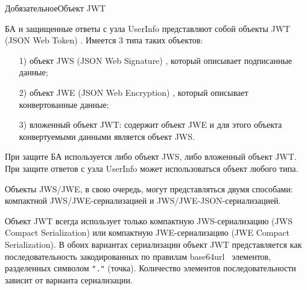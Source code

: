 \begin{appendix}{Д}{обязательное}{Объект JWT}\label{JWT}




БА и защищенные ответы с узла UserInfo представляют собой объекты 
JWT (JSON Web Token) \cite{RFC7519}. 
%
Имеется 3 типа таких объектов: 
\begin{itemize}
\item[1)] 
объект JWS (JSON Web Signature) \cite{RFC7515},
который описывает подписанные данные;
\item[2)] 
объект JWE (JSON Web Encryption) \cite{RFC7516},
который описывает конвертованные данные;
\item[3)] 
вложенный объект JWT: содержит объект JWE
и для этого объекта конвертуемыми данными является объект JWS.
\end{itemize}

При защите БА используется либо объект JWS, либо вложенный объект JWT.
При защите ответов с узла UserInfo может использоваться объект любого типа. 

Объекты JWS/JWE, в свою очередь, могут представляться двумя способами: 
компактной JWS/JWE-сериализацией и JWS/JWE-JSON-сериализацией.

Объект JWT всегда использует только компактную JWS-сериализацию (JWS 
Compact Serialization) или компактную JWE-сериализацию (JWE Compact 
Serialization). 
%
В обоих вариантах сериализации объект JWT представляется как последовательность 
закодированных по правилам base64url~\cite{RFC4648} элементов, разделенных 
символом \lstinline{"."} (точка). 
Количество элементов последовательности зависит от варианта сериализации.  


\end{appendix}
